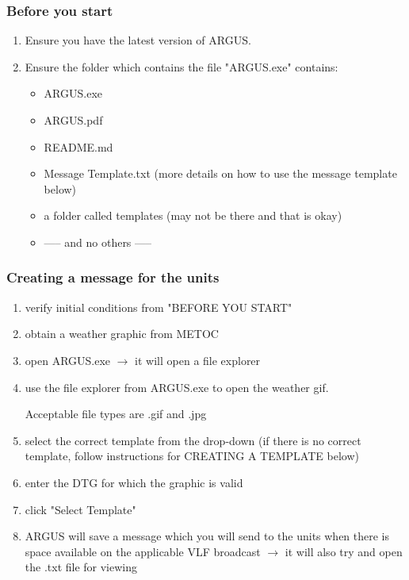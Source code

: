 \subsubsection{Before you start}
\begin{enumerate}
    \item Ensure you have the latest version of ARGUS.
    \item Ensure the folder which contains the file "ARGUS.exe" contains:
    \begin{itemize}
        \item ARGUS.exe
        \item ARGUS.pdf
        \item README.md
        \item Message Template.txt (more details on how to use the message template below)
        \item a folder called templates (may not be there and that is okay)
        \item ----- and no others -----
    \end{itemize}
\end{enumerate}

\subsubsection{Creating a message for the units}
\begin{enumerate}
    \item verify initial conditions from "BEFORE YOU START"
    \item obtain a weather graphic from METOC
    \item open ARGUS.exe $\rightarrow$ it will open a file explorer
    \item use the file explorer from ARGUS.exe to open the weather gif.
    \begin{addnote} Acceptable file types are .gif and .jpg \end{addnote}
    \item select the correct template from the drop-down (if there is no correct template, follow instructions for CREATING A TEMPLATE below)
    \item enter the DTG for which the graphic is valid
    \item click "Select Template"
    \item ARGUS will save a message which you will send to the units when there is space available on the applicable VLF broadcast $\rightarrow$ it will also try and open the .txt file for viewing
\end{enumerate}

